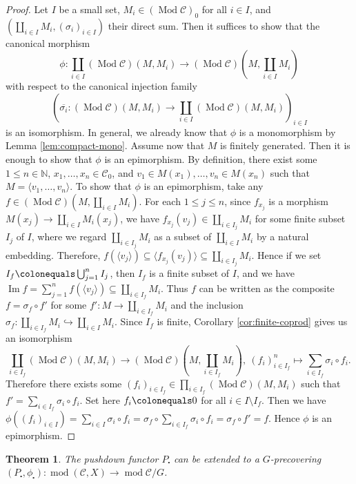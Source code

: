 \documentclass{surv-l}
\numberwithin{equation}{chapter}
\numberwithin{figure}{chapter}
\theoremstyle{plain}
\newtheorem{thm}{Theorem}[section]
\theoremstyle{definition}
\theoremstyle{remark}
\DeclareMathOperator{\Mod}{Mod}
\begin{document}
\begin{proof}
Let $I$ be a small set, $M_i \!\in\! (\Mod{\mathcal{C}})_0$ for all $i \!\in\! I$, and
$(\coprod_{i\in I}M_i, (\sigma_i)_{i\in I})$ their direct sum.
Then it suffices to show that the canonical morphism
\[
\phi \colon \coprod_{i\in I} (\Mod{\mathcal{C}})(M, M_i) \to (\Mod{\mathcal{C}})(M,\coprod_{i\in I}M_i)
\]
with respect to the canonical injection family
\[
(\overline{\sigma_i}\colon (\Mod{\mathcal{C}})(M, M_i) \to \coprod_{i\in I}(\Mod{\mathcal{C}})(M, M_i))_{i\in I}
\]
is an isomorphism.
In general, we already know that $\phi$ is a monomorphism by Lemma \ref{lem:compact-mono}.
Assume now that $M$ is finitely generated.
Then it is enough to show that $\phi$ is an epimorphism.
By definition, there exist some $1 \le n \in \mathbb{N}$, $x_1, \dots, x_n \in {\mathcal{C}}_0$, and
$v_1 \in M(x_1),\dots, v_n \in M(x_n)$ such that $M = {\langle v_1, \dots, v_n \rangle}$.
To show that $\phi$ is an epimorphism, take any $f \in (\Mod{\mathcal{C}})(M, \coprod_{i\in I}M_i)$.
For each $1 \le j \le n$, since $f_{x_j}$ is a morphism $M(x_j) \to \coprod_{i\in I}M_i(x_j)$,
we have $f_{x_j}(v_j) \in \coprod_{i \in I_j}M_i$
for some finite subset $I_j$ of $I$, where
we regard $\coprod_{i \in I_j}M_i$ as a subset of %
$\coprod_{i \in I}M_i$ 
 by a natural embedding.
Therefore, $f({\langle v_j \rangle}) \subseteq {\langle f_{x_j}(v_j) \rangle} \subseteq \coprod_{i \in I_j}M_i$.
Hence if we set $I_f\colonequals  \bigcup_{j=1}^nI_j$, then $I_f$ is a finite subset of $I$, and we have
$\operatorname{Im} f = \sum_{j=1}^n f({\langle v_j \rangle}) \subseteq \coprod_{i \in I_f}M_i$.
Thus $f$ can be written as the composite $f = \sigma_f \circ f'$ for some $f' \colon M \to \coprod_{i \in I_f}M_i$
and the inclusion $\sigma_f \colon \coprod_{i \in I_f}M_i \hookrightarrow \coprod_{i \in I}M_i$.
Since $I_f$ is finite, Corollary \ref{cor:finite-coprod} gives us an isomorphism
\[
\coprod_{i\in I_f}(\Mod{\mathcal{C}})(M, M_i) \to (\Mod{\mathcal{C}})(M, \coprod_{i \in I_f}M_i),\
(f_i)_{i\in I_f}^n \mapsto \sum_{i \in I_f} \sigma_i \circ f_i.
\]
Therefore there exists some $(f_i)_{i\in I_f} \in \prod_{i\in I_f}(\Mod{\mathcal{C}})(M, M_i)$
such that $f' = \sum_{i \in I_f} \sigma_i \circ f_i$.
Set here $f_i\colonequals  0$ for all $i \in I \setminus I_f$.
Then we have
$\phi((f_i)_{i\in I}) = \sum_{i\in I}\sigma_i \circ f_i =  \sigma_f \circ \sum_{i\in I_f}\sigma_i \circ f_i = \sigma_f \circ f' = f$.
Hence $\phi$ is an epimorphism.
\end{proof}

\begin{thm}\label{pushdown-precov1}
The pushdown functor $P_{\centerdot}$ can be extended to a $G$-precovering
$(P_{\centerdot}, \phi_{\centerdot}) \colon \operatorname{mod} ({\mathcal{C}}, X) \to \operatorname{mod} {\mathcal{C}}/G$.
\end{thm}
\end{document}

